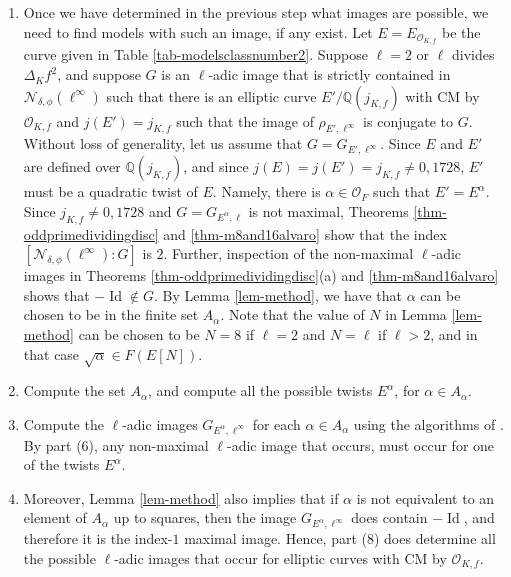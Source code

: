 \documentclass[11pt]{amsart}
\theoremstyle{definition}
\newcommand{\Q}{\mathbb Q}
\newcommand{\OF}{\mathcal{O}_F}
\newcommand{\Of}{\mathcal{O}_{K,f}}
\begin{document}
\begin{enumerate}
\begin{enumerate}
    \item If $\ell>2$ and it does not divide $\Delta_K f^2$ (and since we know that $j_{K,f}\neq 0,1728$ in this case), then Theorem \ref{thm-goodredn} shows that there is only one possible $\ell$-adic image, namely the index-$1$ maximal normalizer image determined by the order, with label \texttt{$\ell$.0.c-1.1.1}.

    \item If $\ell>2$ is a divisor of $\Delta_K f^2$, then Theorem \ref{thm-oddprimedividingdisc}, shows that there are three possible $\ell$-adic images, namely \texttt{$\ell$.$\nu$.c-1.1.1}, \texttt{$\ell$.$\nu$.c-$\ell$.2.1}, and \texttt{$\ell$.$\nu$.c-$\ell$.2.2}. We note that not all three need to occur, see Example \ref{ex-method2} for such a case.
    \end{enumerate} 
    \item Once we have determined in the previous step what images are possible, we need to find models with such an image, if any exist. Let $E=E_{\Of}$ be the curve given in Table \ref{tab-modelsclassnumber2}. Suppose $\ell=2$ or $\ell$ divides $\Delta_K f^2$, and suppose $G$ is an $\ell$-adic image that is strictly contained in $\mathcal{N}_{\delta,\phi}(\ell^\infty)$ such that there is an elliptic curve $E'/\Q(j_{K,f})$ with CM by $\Of$ and $j(E')=j_{K,f}$ such that the image of $\rho_{E',\ell^\infty}$ is conjugate to $G$. Without loss of generality, let us assume that $G=G_{E',\ell^\infty}$. Since $E$ and $E'$ are defined over $\Q(j_{K,f})$, and since $j(E)=j(E')=j_{K,f}\neq 0,1728$, $E'$ must be a quadratic twist of $E$. Namely, there is $\alpha \in \OF$ such that $E'=E^\alpha$. Since $j_{K,f} \neq 0, 1728$ and $G = G_{E^{\alpha}, \ell}$ is not maximal, Theorems \ref{thm-oddprimedividingdisc} and \ref{thm-m8and16alvaro} show that the index $[\mathcal{N}_{\delta,\phi}(\ell^\infty):G]$ is $2$. Further, inspection of the non-maximal $\ell$-adic images in Theorems \ref{thm-oddprimedividingdisc}(a) and \ref{thm-m8and16alvaro} shows that $-\operatorname{Id} \notin G$. By Lemma \ref{lem-method}, we have that $\alpha$ can be chosen to be in the finite set $A_\alpha$. Note that the value of $N$ in Lemma \ref{lem-method} can be chosen to be $N=8$ if $\ell=2$ and $N=\ell$ if $\ell>2$, and in that case $\sqrt{\alpha}\in F(E[N])$.
    \item Compute the set $A_\alpha$, and compute all the possible twists $E^\alpha$, for $\alpha\in A_\alpha$.
    \item Compute the $\ell$-adic images $G_{E^\alpha,\ell^\infty}$ for each $\alpha \in A_\alpha$ using the algorithms of \cite{elladic}. By part (6), any non-maximal $\ell$-adic image that occurs, must occur for one of the twists $E^\alpha$.
    \item Moreover, Lemma \ref{lem-method} also implies that if $\alpha$ is not equivalent to an element of $A_\alpha$ up to squares, then the image $G_{E^\alpha,\ell^\infty}$ does contain $-\operatorname{Id}$, and therefore it is the index-$1$ maximal image. Hence, part (8) does determine all the possible $\ell$-adic images that occur for elliptic curves with CM by $\Of$.
\end{enumerate}
\end{document}
